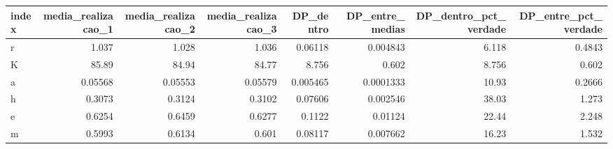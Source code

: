 \begin{tabular}{lrrrrrrr}
\toprule
index & media\_realizacao\_1 & media\_realizacao\_2 & media\_realizacao\_3 & DP\_dentro & DP\_entre\_medias & DP\_dentro\_pct\_verdade & DP\_entre\_pct\_verdade \\
\midrule
r & 1.037 & 1.028 & 1.036 & 0.06118 & 0.004843 & 6.118 & 0.4843 \\
K & 85.89 & 84.94 & 84.77 & 8.756 & 0.602 & 8.756 & 0.602 \\
a & 0.05568 & 0.05553 & 0.05579 & 0.005465 & 0.0001333 & 10.93 & 0.2666 \\
h & 0.3073 & 0.3124 & 0.3102 & 0.07606 & 0.002546 & 38.03 & 1.273 \\
e & 0.6254 & 0.6459 & 0.6277 & 0.1122 & 0.01124 & 22.44 & 2.248 \\
m & 0.5993 & 0.6134 & 0.601 & 0.08117 & 0.007662 & 16.23 & 1.532 \\
\bottomrule
\end{tabular}

